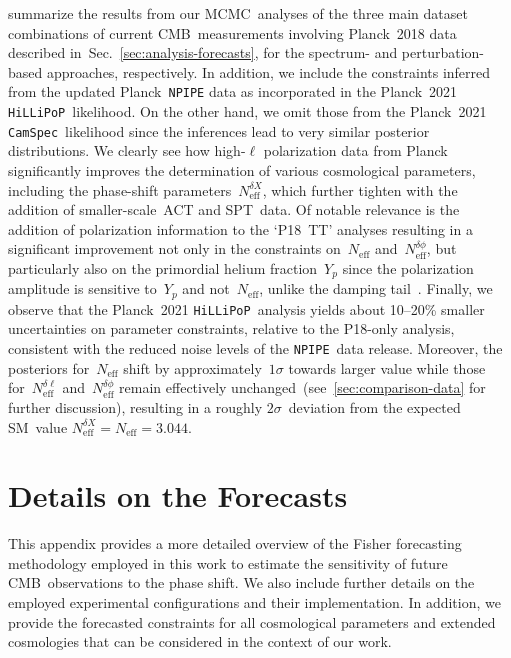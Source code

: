 \documentclass[11pt]{article}
\numberwithin{equation}{section}
\newcommand{\Neff}{N_\mathrm{eff}}
\newcommand{\Nphase}{N_\mathrm{eff}^{\delta\phi}}
\newcommand{\Nmultipole}{N_\mathrm{eff}^{\delta\ell}}
\begin{document}
summarize the results from our MCMC~analyses of the three main dataset combinations of current CMB~measurements involving Planck~2018 data described in~Sec.~\ref{sec:analysis-forecasts}, for the spectrum- and perturbation-based approaches, respectively. In addition, we include the constraints inferred from the updated Planck~\texttt{NPIPE} data as incorporated in the Planck~2021 \texttt{HiLLiPoP}~likelihood. On the other hand, we omit those from the Planck~2021 \texttt{CamSpec}~likelihood since the inferences lead to very similar posterior distributions. We clearly see how high-$\ell$ polarization data from Planck significantly improves the determination of various cosmological parameters, including the phase-shift parameters~$\Neff^{\delta X}$, which further tighten with the addition of smaller-scale~ACT and SPT~data. Of notable relevance is the addition of polarization information to the `P18~TT' analyses resulting in a significant improvement not only in the constraints on~$\Neff$ and~$\Nphase$, but particularly also on the primordial helium fraction~$Y_p$ since the polarization amplitude is sensitive to~$Y_p$ and not~$\Neff$, unlike the damping tail~\cite{Baumann:2015rya}. Finally, we observe that the Planck~2021 \texttt{HiLLiPoP}~analysis yields about 10--20\% smaller uncertainties on parameter constraints, relative to the P18-only analysis, consistent with the reduced noise levels of the \texttt{NPIPE}~data release. Moreover, the posteriors for~$\Neff$ shift by approximately~$1\sigma$ towards larger value while those for~$\Nmultipole$ and~$\Nphase$ remain effectively unchanged~(see~\textsection\ref{sec:comparison-data} for further discussion), resulting in a roughly $2\sigma$~deviation from the expected SM~value $\Neff^{\delta X} = \Neff = 3.044$.



\clearpage
\section{Details on the Forecasts}
\label{app:forecasts}

This appendix provides a more detailed overview of the Fisher forecasting methodology employed in this work to estimate the sensitivity of future CMB~observations to the phase shift. We also include further details on the employed experimental configurations and their implementation. In addition, we provide the forecasted constraints for all cosmological parameters and extended cosmologies that can be considered in the context of our work.\medskip
\end{document}
